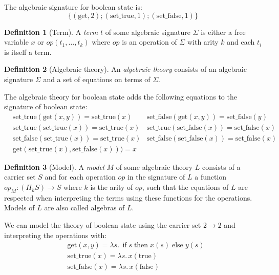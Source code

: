 \documentclass[acmsmall, screen, nonacm]{acmart}
\theoremstyle{definition}
\newtheorem{definition}{Definition}[section]
\newcommand{\mif}{\mathop{\mathrm{if}}}
\newcommand{\mthen}{\mathop{\mathrm{then}}}
\newcommand{\melse}{\mathop{\mathrm{else}}}
\begin{document}
\begin{example}
  The algebraic signature for boolean state is:
  \begin{equation*}
    \{ (\mathrm{get}, 2); (\mathrm{set\_true}, 1); (\mathrm{set\_false}, 1) \}
  \end{equation*}
\end{example}

\begin{definition}[Term]
  A \emph{term} $t$ of some algebraic signature $\Sigma$ is either a
  free variable $x$ or $op(t_1, \ldots, t_k)$ where $op$ is an operation
  of $\Sigma$ with arity $k$ and each $t_i$ is itself a term.
\end{definition}

\begin{definition}[Algebraic theory]
  An \emph{algebraic theory} consists of an algebraic signature $\Sigma$ and a set of
  equations on terms of $\Sigma$.
\end{definition}

\begin{example}
  The algebraic theory for boolean state adds the following equations to
  the signature of boolean state:
  \begin{align*}
    &\mathrm{set\_true}(\mathrm{get}(x, y)) = \mathrm{set\_true}(x)
    &\mathrm{set\_false}(\mathrm{get}(x, y)) = \mathrm{set\_false}(y) \\
    &\mathrm{set\_true}(\mathrm{set\_true}(x)) = \mathrm{set\_true}(x)
    &\mathrm{set\_true}(\mathrm{set\_false}(x)) = \mathrm{set\_false}(x) \\
    &\mathrm{set\_false}(\mathrm{set\_true}(x)) = \mathrm{set\_true}(x)
    &\mathrm{set\_false}(\mathrm{set\_false}(x)) = \mathrm{set\_false}(x) \\
    &\mathrm{get}(\mathrm{set\_true}(x), \mathrm{set\_false}(x))) = x
  \end{align*}
\end{example}

\begin{definition}[Model]
  A \emph{model} $M$ of some algebraic theory $L$ consists of a carrier
  set $S$ and for each operation $op$ in the signature of $L$ a function
  $op_M : (\Pi_k S) \rightarrow S$ where $k$ is the arity of $op$, such
  that the equations of $L$ are respected when interpreting the terms
  using these functions for the operations. Models of $L$ are also
  called algebras of $L$.
\end{definition}

\begin{example}
  We can model the theory of boolean state using the carrier set
  $2 \rightarrow 2$ and interpreting the operations with:
  \begin{align*}
    &\mathrm{get}(x, y) = \lambda s.\, \mif s \mthen x(s) \melse y(s) \\
    &\mathrm{set\_true}(x) = \lambda s.\, x(\mathrm{true}) \\
    &\mathrm{set\_false}(x) = \lambda s.\, x(\mathrm{false})
  \end{align*}
\end{example}
\end{document}
